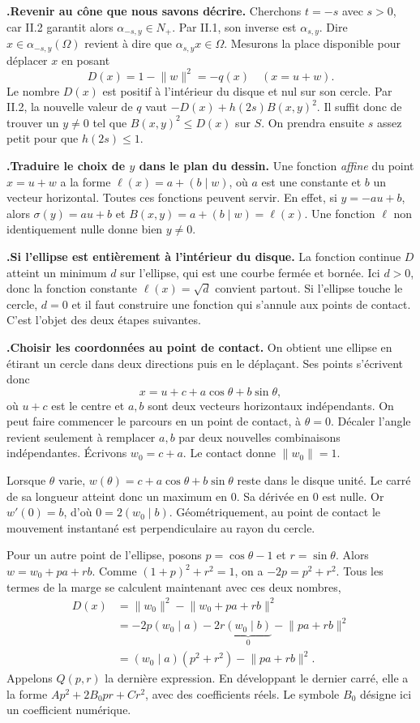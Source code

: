 \documentclass[a4paper,12pt]{article}
\newcommand{\Om}{\Omega}
\newcommand{\norm}[1]{\lVert #1\rVert}
\newcommand{\ps}[2]{(#1\mid #2)}
\newcounter{pas}
\newcommand{\etape}[1]{\par\Needspace{2.25\baselineskip}\smallskip\stepcounter{pas}%
  \textbf{\textcolor{deep}{\thepas.\enspace #1}}\enspace\ignorespaces}
\begin{document}
\etape{Revenir au cône que nous savons décrire.}
Cherchons $t=-s$ avec $s>0$, car II.2 garantit alors $\alpha_{-s,y}\in N_+$. Par II.1, son inverse est $\alpha_{s,y}$. Dire $x\in\alpha_{-s,y}(\Om)$ revient à dire que $\alpha_{s,y}x\in\Om$. Mesurons la place disponible pour déplacer $x$ en posant
\[
              D(x)=1-\norm{w}^2=-q(x)\quad(x=u+w).
\]
Le nombre $D(x)$ est positif à l'intérieur du disque et nul sur son cercle. Par II.2, la nouvelle valeur de $q$ vaut $-D(x)+h(2s)B(x,y)^2$. Il suffit donc de trouver un $y\ne0$ tel que $B(x,y)^2\leq D(x)$ sur $S$. On prendra ensuite $s$ assez petit pour que $h(2s)\leq1$.

\etape{Traduire le choix de $y$ dans le plan du dessin.}
Une fonction \emph{affine} du point $x=u+w$ a la forme $\ell(x)=a+\ps{b}{w}$, où $a$ est une constante et $b$ un vecteur horizontal. Toutes ces fonctions peuvent servir. En effet, si $y=-au+b$, alors $\sigma(y)=au+b$ et $B(x,y)=a+\ps{b}{w}=\ell(x)$. Une fonction $\ell$ non identiquement nulle donne bien $y\ne0$.

\etape{Si l'ellipse est entièrement à l'intérieur du disque.}
La fonction continue $D$ atteint un minimum $d$ sur l'ellipse, qui est une courbe fermée et bornée. Ici $d>0$, donc la fonction constante $\ell(x)=\sqrt{d}$ convient partout. Si l'ellipse touche le cercle, $d=0$ et il faut construire une fonction qui s'annule aux points de contact. C'est l'objet des deux étapes suivantes.

\etape{Choisir les coordonnées au point de contact.}
On obtient une ellipse en étirant un cercle dans deux directions puis en le déplaçant. Ses points s'écrivent donc
\[
 x=u+c+a\cos\theta+b\sin\theta ,
\]
où $u+c$ est le centre et $a,b$ sont deux vecteurs horizontaux indépendants. On peut faire commencer le parcours en un point de contact, à $\theta=0$. Décaler l'angle revient seulement à remplacer $a,b$ par deux nouvelles combinaisons indépendantes. Écrivons $w_0=c+a$. Le contact donne $\norm{w_0}=1$.

Lorsque $\theta$ varie, $w(\theta)=c+a\cos\theta+b\sin\theta$ reste dans le disque unité. Le carré de sa longueur atteint donc un maximum en $0$. Sa dérivée en $0$ est nulle. Or $w'(0)=b$, d'où $0=2\ps{w_0}{b}$. Géométriquement, au point de contact le mouvement instantané est perpendiculaire au rayon du cercle.

Pour un autre point de l'ellipse, posons $p=\cos\theta-1$ et $r=\sin\theta$. Alors $w=w_0+pa+rb$. Comme $(1+p)^2+r^2=1$, on a $-2p=p^2+r^2$. Tous les termes de la marge se calculent maintenant avec ces deux nombres,
\begin{align*}
 D(x)&=\norm{w_0}^2-\norm{w_0+pa+rb}^2\\
     &=-2p\ps{w_0}{a}-2r\underbrace{\ps{w_0}{b}}_{0}-\norm{pa+rb}^2\\
     &=\ps{w_0}{a}(p^2+r^2)-\norm{pa+rb}^2 .
\end{align*}
Appelons $Q(p,r)$ la dernière expression. En développant le dernier carré, elle a la forme $A p^2+2B_0pr+C r^2$, avec des coefficients réels. Le symbole $B_0$ désigne ici un coefficient numérique.
\end{document}
